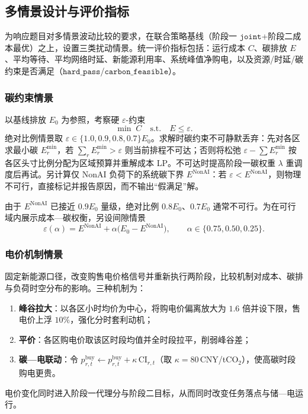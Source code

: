 \subsection{多情景设计与评价指标}

为响应题目对多情景波动比较的要求，在联合策略基线（阶段一 \(\texttt{joint}\)+阶段二成本最优）之上，设置三类扰动情景。统一评价指标包括：运行成本 \(C\)、碳排放 \(E\)、平均等待、平均网络时延、新能源利用率、系统峰值净购电，以及资源/时延/碳约束是否满足（\(\texttt{hard\_pass}\)/\(\texttt{carbon\_feasible}\)）。

\subsubsection{碳约束情景}

以基线排放 \(E_0\) 为参照，考察硬 \(\varepsilon\)-约束
\begin{equation}
\min\; C
\quad
\mathrm{s.t.}
\quad
E\le\varepsilon.
\end{equation}
绝对比例情景取 \(\varepsilon\in\{1.0,0.9,0.8,0.7\}E_0\)。求解时碳约束不可静默丢弃：先对各区求最小碳 \(E^{\min}_r\)，若 \(\sum_r E^{\min}_r>\varepsilon\) 则当前排程不可达；否则将松弛 \(\varepsilon-\sum E^{\min}_r\) 按各区头寸比例分配为区域预算并重解成本 LP。不可达时提高阶段一碳权重 \(\lambda\) 重调度后再试。另计算仅 NonAI 负荷下的系统碳下界 \(E^{\mathrm{NonAI}}\)：若 \(\varepsilon<E^{\mathrm{NonAI}}\)，则物理不可行，直接标记并报告原因，而不输出“假满足”解。

由于 \(E^{\mathrm{NonAI}}\) 已接近 \(0.9E_0\) 量级，绝对比例 \(0.8E_0\)、\(0.7E_0\) 通常不可行。为在可行域内展示成本—碳权衡，另设间隙情景
\begin{equation}
\varepsilon(\alpha)=E^{\mathrm{NonAI}}+\alpha\bigl(E_0-E^{\mathrm{NonAI}}\bigr),
\qquad
\alpha\in\{0.75,0.50,0.25\}.
\end{equation}

\subsubsection{电价机制情景}

固定新能源口径，改变购售电价格信号并重新执行两阶段，比较机制对成本、碳排与负荷时空分布的影响。三种机制为：
\begin{enumerate}
\item \textbf{峰谷拉大}：以各区小时均价为中心，将购电价偏离放大为 \(1.6\) 倍并设下限，售电价上浮 \(10\%\)，强化分时套利动机；
\item \textbf{平价}：各区购电价取该区时段均值并全时段拉平，削弱峰谷差；
\item \textbf{碳—电联动}：令 \(p^{\mathrm{buy}}_{r,t}\leftarrow p^{\mathrm{buy}}_{r,t}+\kappa\,\mathrm{CI}_{r,t}\)（取 \(\kappa=80\)\,CNY/tCO\(_2\)），使高碳时段购电更贵。
\end{enumerate}
电价变化同时进入阶段一代理分与阶段二目标，从而同时改变任务落点与储—电运行。

